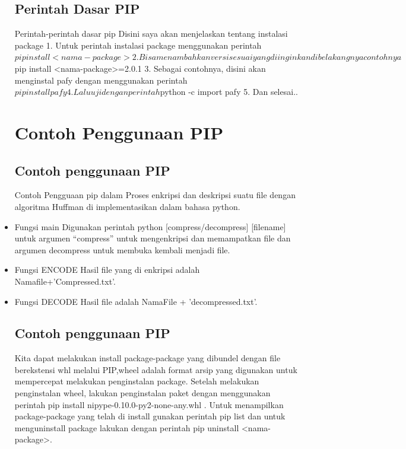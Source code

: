 \documentclass[12pt,a4paper]{article}
\begin{document}
\begin{itemize}
\subsection{Perintah Dasar PIP}
Perintah-perintah dasar pip
Disini saya akan menjelaskan tentang instalasi package
1.	Untuk perintah instalasi package menggunakan perintah $pip install <nama-package>
2.	Bisa menambahkan versi sesuai yang diinginkan dibelakangnya contohnya $pip install <nama-package>=2.0.1
3.	Sebagai contohnya, disini akan menginstal pafy dengan menggunakan perintah $ pip install pafy
4.	Lalu uji dengan perintah $python -c import pafy
5.	Dan selesai..

\section{Contoh Penggunaan PIP}
\subsection{Contoh penggunaan PIP} 
Contoh Pengguaan pip dalam Proses enkripsi dan deskripsi suatu file dengan algoritma Huffman di implementasikan dalam bahasa python.
\item	Fungsi main
Digunakan perintah python [compress/decompress] [filename] untuk argumen “compress” untuk mengenkripsi dan memampatkan file dan argumen decompress untuk membuka kembali menjadi file.
\item	Fungsi ENCODE
Hasil file yang di enkripsi adalah Namafile+’Compressed.txt’.
\item	Fungsi DECODE
Hasil file adalah NamaFile + ’decompressed.txt’.
\subsection{Contoh penggunaan PIP}
Kita dapat melakukan install package-package yang dibundel dengan file berekstensi whl melalui PIP,wheel adalah format arsip yang digunakan untuk mempercepat melakukan penginstalan package. Setelah melakukan penginstalan wheel, lakukan penginstalan paket dengan menggunakan perintah pip install nipype-0.10.0-py2-none-any.whl . Untuk menampilkan package-package yang telah di install gunakan perintah pip list dan untuk menguninstall package lakukan dengan perintah pip uninstall <nama-package>.

\end{itemize}
\end{document}
